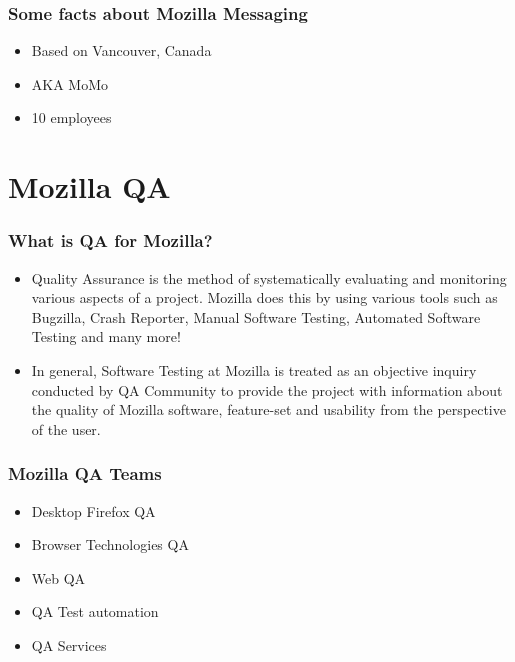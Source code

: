 \documentclass{beamer}
\begin{document}

\begin{frame}
\frametitle{Some facts about Mozilla Messaging}
 \begin{itemize}
 \item Based on Vancouver, Canada
 \item AKA MoMo
 \item 10 employees
 \end{itemize}
\end{frame}


\section{Mozilla QA}


\begin{frame}
\frametitle{What is QA for Mozilla?}
 \begin{itemize}

 \item Quality Assurance is the method of systematically evaluating and monitoring various aspects of a project. Mozilla does this by using various tools such as Bugzilla, Crash Reporter, Manual Software Testing, Automated Software Testing and many more!

 \item In general, Software Testing at Mozilla is treated as an objective inquiry conducted by QA Community to provide the project with information about the quality of Mozilla software, feature-set and usability from the perspective of the user.

 \end{itemize}
\end{frame}


\begin{frame}
\frametitle{Mozilla QA Teams}
 \begin{itemize}
 \item Desktop Firefox QA
 \item Browser Technologies QA
 \item Web QA
 \item QA Test automation
 \item QA Services
 \end{itemize}
\end{frame}
\end{document}
